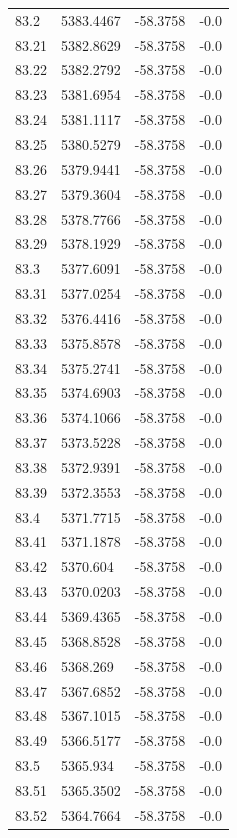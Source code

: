 \begin{table}[H]
\begin{tabular}{llll}
83.2 & 5383.4467 & -58.3758 & -0.0 \\
83.21 & 5382.8629 & -58.3758 & -0.0 \\
83.22 & 5382.2792 & -58.3758 & -0.0 \\
83.23 & 5381.6954 & -58.3758 & -0.0 \\
83.24 & 5381.1117 & -58.3758 & -0.0 \\
83.25 & 5380.5279 & -58.3758 & -0.0 \\
83.26 & 5379.9441 & -58.3758 & -0.0 \\
83.27 & 5379.3604 & -58.3758 & -0.0 \\
83.28 & 5378.7766 & -58.3758 & -0.0 \\
83.29 & 5378.1929 & -58.3758 & -0.0 \\
83.3 & 5377.6091 & -58.3758 & -0.0 \\
83.31 & 5377.0254 & -58.3758 & -0.0 \\
83.32 & 5376.4416 & -58.3758 & -0.0 \\
83.33 & 5375.8578 & -58.3758 & -0.0 \\
83.34 & 5375.2741 & -58.3758 & -0.0 \\
83.35 & 5374.6903 & -58.3758 & -0.0 \\
83.36 & 5374.1066 & -58.3758 & -0.0 \\
83.37 & 5373.5228 & -58.3758 & -0.0 \\
83.38 & 5372.9391 & -58.3758 & -0.0 \\
83.39 & 5372.3553 & -58.3758 & -0.0 \\
83.4 & 5371.7715 & -58.3758 & -0.0 \\
83.41 & 5371.1878 & -58.3758 & -0.0 \\
83.42 & 5370.604 & -58.3758 & -0.0 \\
83.43 & 5370.0203 & -58.3758 & -0.0 \\
83.44 & 5369.4365 & -58.3758 & -0.0 \\
83.45 & 5368.8528 & -58.3758 & -0.0 \\
83.46 & 5368.269 & -58.3758 & -0.0 \\
83.47 & 5367.6852 & -58.3758 & -0.0 \\
83.48 & 5367.1015 & -58.3758 & -0.0 \\
83.49 & 5366.5177 & -58.3758 & -0.0 \\
83.5 & 5365.934 & -58.3758 & -0.0 \\
83.51 & 5365.3502 & -58.3758 & -0.0 \\
83.52 & 5364.7664 & -58.3758 & -0.0 \\

\end{tabular}
\end{table}
